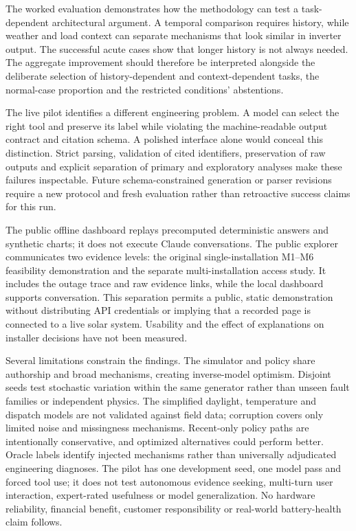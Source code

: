 \documentclass[11pt,a4paper]{article}
\begin{document}
The worked evaluation demonstrates how the methodology can test a task-dependent architectural argument. A temporal comparison requires history, while weather and load context can separate mechanisms that look similar in inverter output. The successful acute cases show that longer history is not always needed. The aggregate improvement should therefore be interpreted alongside the deliberate selection of history-dependent and context-dependent tasks, the normal-case proportion and the restricted conditions' abstentions.


The live pilot identifies a different engineering problem. A model can select the right tool and preserve its label while violating the machine-readable output contract and citation schema. A polished interface alone would conceal this distinction. Strict parsing, validation of cited identifiers, preservation of raw outputs and explicit separation of primary and exploratory analyses make these failures inspectable. Future schema-constrained generation or parser revisions require a new protocol and fresh evaluation rather than retroactive success claims for this run.


The public offline dashboard replays precomputed deterministic answers and synthetic charts; it does not execute Claude conversations. The public explorer communicates two evidence levels: the original single-installation M1--M6 feasibility demonstration and the separate multi-installation access study. It includes the outage trace and raw evidence links, while the local dashboard supports conversation. This separation permits a public, static demonstration without distributing API credentials or implying that a recorded page is connected to a live solar system. Usability and the effect of explanations on installer decisions have not been measured.


Several limitations constrain the findings. The simulator and policy share authorship and broad mechanisms, creating inverse-model optimism. Disjoint seeds test stochastic variation within the same generator rather than unseen fault families or independent physics. The simplified daylight, temperature and dispatch models are not validated against field data; corruption covers only limited noise and missingness mechanisms. Recent-only policy paths are intentionally conservative, and optimized alternatives could perform better. Oracle labels identify injected mechanisms rather than universally adjudicated engineering diagnoses. The pilot has one development seed, one model pass and forced tool use; it does not test autonomous evidence seeking, multi-turn user interaction, expert-rated usefulness or model generalization. No hardware reliability, financial benefit, customer responsibility or real-world battery-health claim follows.
\end{document}
